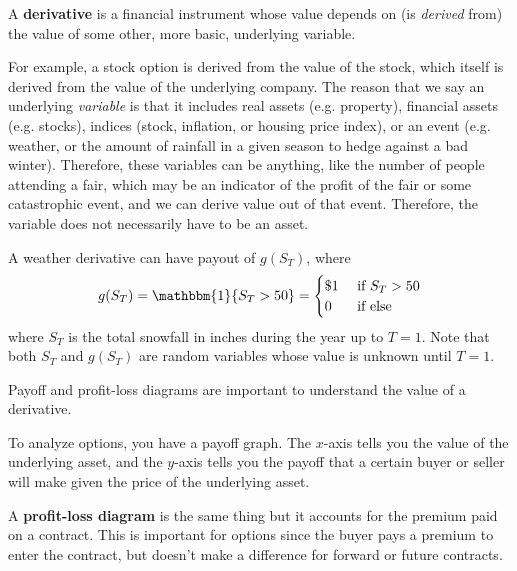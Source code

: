 \documentclass{article}
\begin{document}
    \begin{definition}[Derivatives]
      A \textbf{derivative} is a financial instrument whose value depends on (is \textit{derived} from) the value of some other, more basic, underlying variable. 
    \end{definition}

    For example, a stock option is derived from the value of the stock, which itself is derived from the value of the underlying company. The reason that we say an underlying \textit{variable} is that it includes real assets (e.g. property), financial assets (e.g. stocks), indices (stock, inflation, or housing price index), or an event (e.g. weather, or the amount of rainfall in a given season to hedge against a bad winter). Therefore, these variables can be anything, like the number of people attending a fair, which may be an indicator of the profit of the fair or some catastrophic event, and we can derive value out of that event. Therefore, the variable does not necessarily have to be an asset. 

    \begin{example}
      A weather derivative can have payout of $g(S_T)$, where 
      \begin{equation}
        g(S_T) = \mathbbm{1} \{S_T > 50\} = \begin{cases} \$1 & \text{ if } S_T > 50 \\ 0 & \text{ if else} \end{cases}
      \end{equation}
      where $S_T$ is the total snowfall in inches during the year up to $T = 1$. Note that both $S_T$ and $g(S_T)$ are random variables whose value is unknown until $T = 1$.
    \end{example}

    Payoff and profit-loss diagrams are important to understand the value of a derivative.

    \begin{definition}
      To analyze options, you have a payoff graph. The $x$-axis tells you the value of the underlying asset, and the $y$-axis tells you the payoff that a certain buyer or seller will make given the price of the underlying asset. 
    \end{definition}

    \begin{definition}
      A \textbf{profit-loss diagram} is the same thing but it accounts for the premium paid on a contract. This is important for options since the buyer pays a premium to enter the contract, but doesn't make a difference for forward or future contracts. 
    \end{definition}
\end{document}
